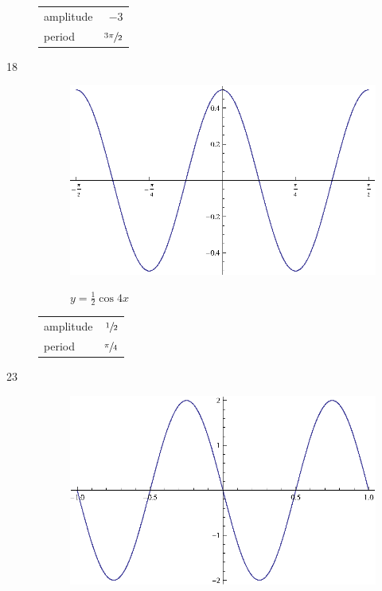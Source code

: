 \documentclass{exam}
\begin{document}
\begin{description}
        \begin{tabular}[H]{lr}
          \toprule
          amplitude & $-3$ \\
          period    & $\sfrac{3 \pi}{2}$ \\
          \bottomrule
        \end{tabular}

      \item[18]
        \begin{figure}[H]
          \centering
          \includegraphics[scale=0.9]{exercise18.eps}

          $y = \frac{1}{2} \cos 4x$
        \end{figure}

        \begin{tabular}[H]{lr}
          \toprule
          amplitude & $\sfrac{1}{2}$ \\
          period    & $\sfrac{\pi}{4}$ \\
          \bottomrule
        \end{tabular}

      \item[23]
        \begin{figure}[H]
          \centering
          \includegraphics[scale=0.9]{exercise23.eps}


\end{figure}
\end{description}
\end{document}
